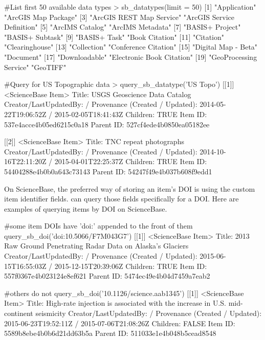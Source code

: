 \begin{example}
#List first 50 available data types
> sb_datatypes(limit = 50)
 [1] "Application"               "ArcGIS Map Package"       
 [3] "ArcGIS REST Map Service"   "ArcGIS Service Definition"
 [5] "ArcIMS Catalog"            "ArcIMS Metadata"          
 [7] "BASIS+ Project"            "BASIS+ Subtask"           
 [9] "BASIS+ Task"               "Book Citation"            
[11] "Citation"                  "Clearinghouse"            
[13] "Collection"                "Conference Citation"      
[15] "Digital Map - Beta"        "Document"                 
[17] "Downloadable"              "Electronic Book Citation" 
[19] "GeoProcessing Service"     "GeoTIFF"  


#Query for US Topographic data
> query_sb_datatype('US Topo')
[[1]]
<ScienceBase Item>
  Title: USGS Geoscience Data Catalog
  Creator/LastUpdatedBy:      /
  Provenance (Created / Updated):  2014-05-22T19:06:52Z / 2015-02-05T18:41:43Z
  Children: TRUE
  Item ID: 537e4acce4b05ed6215c0a18
  Parent ID: 527cf4ede4b0850ea05182ee

[[2]]
<ScienceBase Item>
  Title: TNC repeat photographs
  Creator/LastUpdatedBy:      /
  Provenance (Created / Updated):  2014-10-16T22:11:20Z / 2015-04-01T22:25:37Z
  Children: TRUE
  Item ID: 54404288e4b0b0a643c73143
  Parent ID: 54247f49e4b037b608f9edd1
\end{example}

On ScienceBase, the preferred way of storing an item's DOI is using the custom item
identifier fields.  can query those fields specifically for
a DOI. Here are examples of querying items by DOI on ScienceBase.
\begin{example}
#some item DOIs have 'doi:' appended to the front of them
query_sb_doi('doi:10.5066/F7M043G7')
[[1]]
<ScienceBase Item>
  Title: 2013 Raw Ground Penetrating Radar Data on Alaska's Glaciers
  Creator/LastUpdatedBy:      /
  Provenance (Created / Updated):  2015-06-15T16:55:03Z / 2015-12-15T20:39:06Z
  Children: TRUE
  Item ID: 557f0367e4b023124e8ef621
  Parent ID: 5474ec49e4b04d7459a7eab2

#others do not
query_sb_doi('10.1126/science.aab1345')
[[1]]
<ScienceBase Item>
  Title: High-rate injection is associated with the increase in U.S. mid-continent seismicity
  Creator/LastUpdatedBy:      /
  Provenance (Created / Updated):  2015-06-23T19:52:11Z / 2015-07-06T21:08:26Z
  Children: FALSE
  Item ID: 5589b8ebe4b0b6d21dd63b5a
  Parent ID: 511033e1e4b048b5cead8548
\end{example}

